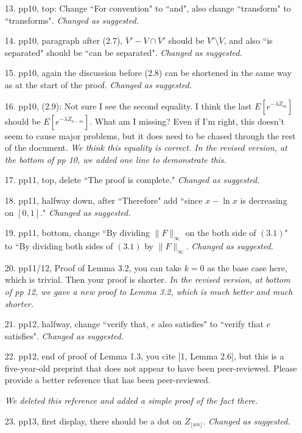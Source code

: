\documentclass[12pt,a4paper]{amsart}
\numberwithin{equation}{section}
\begin{document}
\begin{itemize}
\\	
\item[13.]
	pp10, top: Change ``For convention" to ``and", also change ``transform" to ``transforms".
	{\it Changed as suggested.}
\\
\item[14.]
	pp10, paragraph after (2.7), $\ddot V' - \ddot V\cap \ddot V'$ should be $\ddot V'\setminus \ddot V$, and also ``is separated" should be ``can be separated".
	{\it Changed as suggested.}
\\
\item [15.]
	pp10, again the discussion before (2.8) can be shortened in the same way as at the start of the proof.
	{\it Changed as suggested.}	
\\
\item [16.]
	pp10, (2.9): Not sure I see the second equality.
	I think the last $E[e^{- \lambda \dot Z_m}]$ should be $E[e^{- \lambda \dot Z_{n-m}}]$.
	What am I missing?
	Even if I'm right, this doesn't seem to cause major problems, but it does need to be chased through the rest of the document.
	{\it We think this equality is correct.
	In the revised version, at the bottom of pp 10, we added 
one line
to demonstrate this.}
\\
\item [17.]
	pp11, top, delete ``The proof is complete."
	{\it Changed as suggested.}
\\
\item [18.]
	pp11, halfway down, after ``Therefore" add ``since $x - \ln x$ is decreasing on $[0,1]$."
	{\it Changed as suggested.}
\\
\item [19.]
	pp11, bottom, change ``By dividing $\|F\|_\infty$ on the both side of $(3.1)$" to ``By dividing both sides of $(3.1)$ by $\|F\|_\infty$.
	{\it Changed as suggested.}
\\
\item [20.]
	pp11/12, Proof of Lemma 3.2, you can take $k = 0$ as the base case here, which is trivial.
	Then your proof is shorter.
	{\it
	In the revised version, at bottom of pp 12, we gave a new proof to Lemma 3.2, which is much better and much shorter. }
\\
\item [21.]
	pp12, halfway, change ``verify that, $e$ also satisfies" to ``verify that $e$ satisfies".
	{\it Changed as suggested.}
\\
\item[22.]
	pp12, end of proof of Lemma 1.3, you cite [1, Lemma 2.6], but this is a five-year-old preprint that does not appear to have been peer-reviewed.
	Please provide a better reference that has been peer-reviewed.
	
	{\it 
We deleted this reference and added a simple proof of the fact there.	
	}
\\
\item [23.]
	pp13, first display, there should be a dot on $Z_{\lfloor un \rfloor}$.
	{\it Changed as suggested.}		
\end{itemize}
\end{document}
